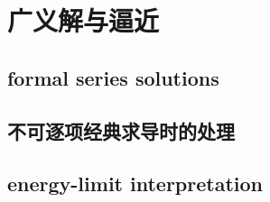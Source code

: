 \section{广义解与逼近}
\label{b2:sec:1004}


\subsection{formal series solutions}
\label{b2:subsec:100401}

\subsection{不可逐项经典求导时的处理}
\label{b2:subsec:100402}

\subsection{energy-limit interpretation}
\label{b2:subsec:100403}


